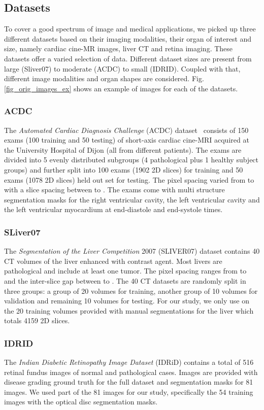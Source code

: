 \documentclass[preprint,12pt, authoryear]{elsarticle}
\begin{document}
\subsection{Datasets}

To cover a good spectrum of image and medical applications, we picked up three different datasets based on their imaging modalities, their organ of interest and size, namely cardiac cine-MR images, liver CT and retina imaging. These datasets offer a varied selection of data. Different dataset sizes are present from large (Sliver07) to moderate (ACDC) to small (IDRID). Coupled with that, different image modalities and organ shapes are considered. Fig. \ref{fig_orig_images_ex} shows an example of images for each of the datasets.
\subsubsection{ACDC}
The {\em Automated Cardiac Diagnosis Challenge} (ACDC) dataset~\citep{bernard2018deep} consists of 150 exams (100 training and 50 testing) of short-axis cardiac cine-MRI acquired at the University Hospital of Dijon (all from different patients).  The exams are divided into 5 evenly distributed subgroups (4 pathological plus 1 healthy subject groups) and further split into 100 exams (1902 2D slices) for training and 50 exams (1078 2D slices) held out set for testing. The pixel spacing varied from  to  with a slice spacing between  to . The exams come with multi structure segmentation masks for the right ventricular cavity, the left ventricular cavity and the left ventricular myocardium at end-diastole and end-systole times.
\subsubsection{SLiver07}
The {\em Segmentation of the Liver Competition} 2007 (SLIVER07) \citep{StynerSliver07} dataset contains 40 CT volumes of the liver enhanced with contrast agent.  Most livers are pathological and include at least one tumor. The pixel spacing ranges from  to  and the inter-slice gap between  to .
The 40 CT datasets are randomly split in three groups: a group of 20 volumes for training, another group of 10 volumes for validation and remaining 10 volumes for testing. For our study, we only use on the 20 training volumes provided with manual segmentations for the liver which totals 4159 2D slices.
\subsubsection{IDRID}
The {\em Indian Diabetic Retinopathy Image Dataset} (IDRiD) \citep{Porwal2018IndianDR} contains a total of 516 retinal fundus images of normal and pathological cases. Images are provided with disease grading ground truth for the full dataset and segmentation masks for 81 images. We used part of the 81 images for our study, specifically the 54 training images with the optical disc segmentation masks.
\end{document}
